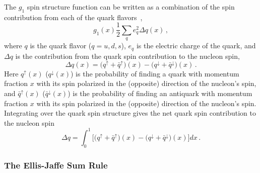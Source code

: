   The $g_1$ spin structure function can be written as a combination of the spin
  contribution from each of the quark flavors~\cite{Bass:2007zzb},
  \begin{equation*}
    g_1(x) \frac{1}{2}\sum_q e_q^2 \Delta q(x) \,,
  \end{equation*}
  where $q$ is the quark flavor ($q = u,d,s$), $e_q$ is the electric charge of
  the quark, and $\Delta q$ is the contribution from the quark spin
  contribution to the nucleon spin,
  \begin{equation*}
    \Delta q(x) = \big(q^{\uparrow} + \bar{q}^{\uparrow}\big)(x) 
      - \big(q^{\downarrow} + \bar{q}^{\downarrow}\big)(x) \,.
  \end{equation*}
  Here $q^{\uparrow}(x)$ \big($q^{\downarrow}(x)$\big) is the probability of
  finding a quark with momentum fraction $x$ with its spin polarized in the
  (opposite) direction of the nucleon's spin, and $\bar{q}^{\uparrow}(x)$
  \big($\bar{q}^{\downarrow}(x)$\big) is the probability of finding an
  antiquark with momentum fraction $x$ with its spin polarized in the
  (opposite) direction of the nucleon's spin. Integrating over the quark spin
  structure gives the net quark spin contribution to the nucleon spin
  \begin{equation*}
    \Delta q = \int_0^1 \Big[\big(q^{\uparrow} + \bar{q}^{\uparrow}\big)(x)
      - \big(q^{\downarrow} + \bar{q}^{\downarrow}\big)(x) \Big] dx \,.
  \end{equation*}

  \subsubsection{The Ellis-Jaffe Sum Rule}

